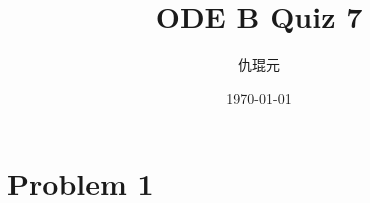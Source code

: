 \documentclass[utf8]{ctexart}
\begin{document}
    \title{ODE B Quiz 7}
    \author{仇琨元}
    \date{\today}
    \maketitle

\section{Problem 1}
\end{document}
